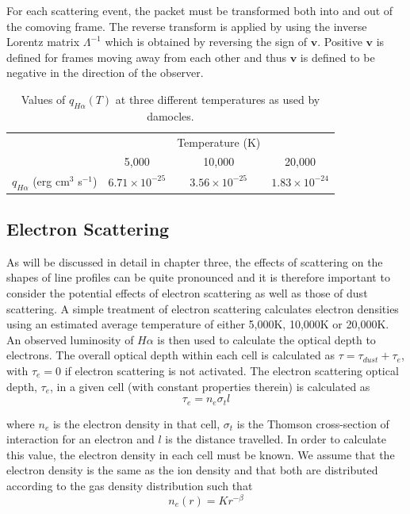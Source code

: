 For each scattering event, the packet must be transformed both into and out of the comoving frame. The reverse transform is applied by using the inverse Lorentz matrix $\Lambda^{-1}$ which is obtained by reversing the sign of $\boldsymbol{v}$.  Positive $\boldsymbol{v}$ is defined for frames moving away from each other and thus $\boldsymbol{v}$ is defined to be negative in the direction of the observer.

\begin{table}[htdp]
\caption{Values of $q_{H\alpha}(T)$ at three different temperatures as used by {\sc damocles}.}
\begin{center}
\def\arraystretch{1.5}
\begin{tabular}{ c c c c}
\toprule
&&Temperature (K) & \\
\cmidrule{2-4}
& 5,000 & 10,000 & 20,000  \\
\midrule
$q_{H\alpha}$ (erg cm$^3$ s$^{-1}$)  & $6.71\times 10^{-25}$	&$3.56\times 10^{-25}$	&$1.83\times 10^{-24}$  \\
\bottomrule
\end{tabular}
\end{center}
\label{tb:q}
        \end{table}%

        \subsection{Electron Scattering}
        \label{scn:ES}

        As will be discussed in detail in chapter three, the effects of scattering on the shapes of line profiles can be quite pronounced and it is therefore important to consider the potential effects of electron scattering as well as those of dust scattering.  A simple treatment of electron scattering calculates electron densities using an estimated average temperature of either 5,000K, 10,000K or 20,000K.  An observed luminosity of $H{\alpha}$ is then used to calculate the optical depth to electrons.  The overall optical depth within each cell is calculated as $\tau = \tau_{dust}+\tau_{e}$, with $\tau_{e}=0$ if electron scattering is not activated.  The electron scattering optical depth, $\tau_e$, in a given cell (with constant properties therein) is calculated as 
        \begin{equation}
        \tau_e =  n_e \sigma_t l
        \end{equation}
        
        \noindent where $n_e$ is the electron density in that cell,  $\sigma_t$ is the Thomson cross-section of interaction for an electron and $l$ is the distance travelled.	
        In order to calculate this value, the electron density in each cell must be known.  We assume that the electron density is the same as the ion density and that both are distributed according to the gas density distribution such that 
        \begin{equation}
        \label{eqn:es_distn}
        n_e(r) = Kr^{-\beta}
        \end{equation}

